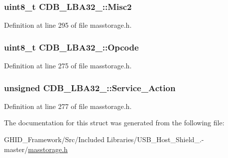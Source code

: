 \hypertarget{struct_c_d_b___l_b_a32__16_a3809ba2a5399bd407b50b04b8c83cb9f}{
\subsubsection[{\-Misc2}]{\setlength{\rightskip}{0pt plus 5cm}uint8\-\_\-t {\bf \-C\-D\-B\-\_\-\-L\-B\-A32\-\_\-::\-Misc2}}}\label{struct_c_d_b___l_b_a32__16_a3809ba2a5399bd407b50b04b8c83cb9f}


\-Definition at line 295 of file masstorage.\-h.

\hypertarget{struct_c_d_b___l_b_a32__16_abc471d94f83905561d961f4f90629521}{
\subsubsection[{\-Opcode}]{\setlength{\rightskip}{0pt plus 5cm}uint8\-\_\-t {\bf \-C\-D\-B\-\_\-\-L\-B\-A32\-\_\-::\-Opcode}}}\label{struct_c_d_b___l_b_a32__16_abc471d94f83905561d961f4f90629521}


\-Definition at line 275 of file masstorage.\-h.

\hypertarget{struct_c_d_b___l_b_a32__16_a7e845f1253ac116a6e9d7178f1f82b6d}{
\subsubsection[{\-Service\-\_\-\-Action}]{\setlength{\rightskip}{0pt plus 5cm}unsigned {\bf \-C\-D\-B\-\_\-\-L\-B\-A32\-\_\-::\-Service\-\_\-\-Action}}}\label{struct_c_d_b___l_b_a32__16_a7e845f1253ac116a6e9d7178f1f82b6d}


\-Definition at line 277 of file masstorage.\-h.



\-The documentation for this struct was generated from the following file\-:\begin{DoxyCompactItemize}
\item 
\-G\-H\-I\-D\-\_\-\-Framework/\-Src/\-Included Libraries/\-U\-S\-B\-\_\-\-Host\-\_\-\-Shield\-\_.-\/master/\hyperlink{masstorage_8h}{masstorage.\-h}\end{DoxyCompactItemize}

